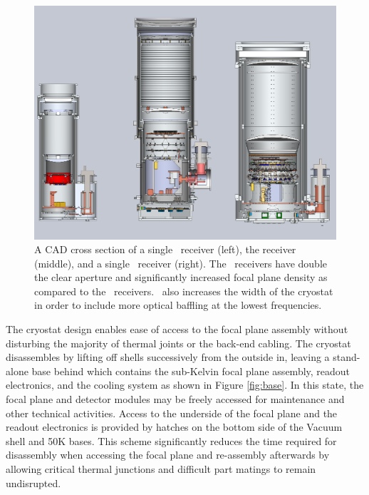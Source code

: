 \documentclass[]{spie}  %
\begin{document}
\begin{figure} [hb]
	\begin{center}
		\includegraphics[scale=0.35]{BA_B3_spud.PDF}
	\end{center}
	\caption{A CAD cross section of a single \keckarray \ receiver (left), the
	 receiver (middle), and a single
	\biceparray \ receiver (right). The \biceparray \ receivers have double
	the clear aperture and significantly increased focal plane density as
	compared to the \keckarray \ receivers. \biceparray \ also increases the
	width of the cryostat in order to include more optical baffling at the
	lowest frequencies.}
	\label{fig:bavskeck}
\end{figure}







The cryostat design enables ease of access to the focal plane assembly without
disturbing the majority of thermal joints or the back-end cabling. The
cryostat disassembles by lifting off shells successively
from the outside in, leaving a stand-alone base behind which contains the
sub-Kelvin focal plane assembly, readout electronics, and the cooling system as shown in Figure
\ref{fig:base}. In this state, the focal plane and detector modules may be
freely accessed for maintenance and other technical activities. Access to the
underside of the focal plane and the readout electronics is provided by
hatches on the bottom side of the Vacuum shell and 50K bases. This scheme
significantly reduces the time required for disassembly when accessing the
focal plane and re-assembly afterwards by allowing critical thermal junctions
and difficult part matings to remain undisrupted.
\end{document}
